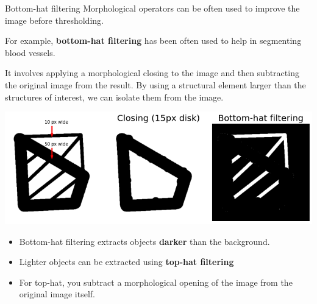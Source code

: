 \documentclass[9pt, aspectratio=169]{beamer}
\begin{document}
\begin{frame}
    {Bottom-hat filtering}
    Morphological operators can be often used to improve the image before thresholding.

    For example, \textbf{bottom-hat filtering} has been often used to help in segmenting blood vessels.

    \pause

    It involves applying a morphological closing to the image and then subtracting the original image from the result.
    By using a structural element larger than the structures of interest, we can isolate them from the image.

    \centering
    \includegraphics[width=.7\textwidth]{bh_example.png}

    \pause
    \small
    \begin{itemize}
        \item Bottom-hat filtering extracts objects \textbf{darker} than the background.
        \item Lighter objects can be extracted using \textbf{top-hat filtering}
        \item For top-hat, you subtract a morphological opening of the image from the original image itself.
    \end{itemize}
\end{frame}
\end{document}
